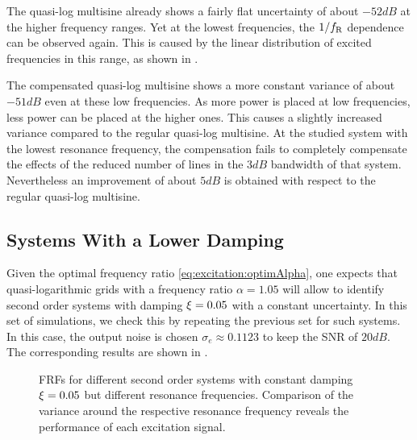   The quasi-log multisine already shows a fairly flat uncertainty of about $-52 \unit{dB}$ at the higher frequency ranges.
  Yet at the lowest frequencies, the $1/f_{\mathrm{R}}$ dependence can be observed again.
  This is caused by the linear distribution of excited frequencies in this range, as shown in .

  The compensated quasi-log multisine shows a more constant variance of about $-51 \unit{dB}$ even at these low frequencies.
  As more power is placed at low frequencies, less power can be placed at the higher ones.
  This causes a slightly increased variance compared to the regular quasi-log multisine.
  At the studied system with the lowest resonance frequency, the compensation fails to completely compensate the effects of the reduced number of lines in the $3\unit{dB}$ bandwidth of that system.
  Nevertheless an improvement of about $5\unit{dB}$ is obtained with respect to the regular quasi-log multisine.

  \subsection{Systems With a Lower Damping}
  Given the optimal frequency ratio \eqref{eq:excitation:optimAlpha}, one expects that quasi-logarithmic grids with a frequency ratio $\alpha = 1.05$ will allow to identify second order systems with damping $\xi_{} = 0.05$ with a constant uncertainty.
  In this set of simulations, we check this by repeating the previous set for such systems.
  In this case, the output noise is chosen $\sigma_e \approx 0.1123$ to keep the \gls{SNR} of $20\unit{dB}$.
  The corresponding results are shown in .
 
  \begin{figure}%
    \centering
      \setlength{}
      \setlength\figureheight{0.68\figurewidth}
    
    \caption[Simulated  of systems (damping $\xi=0.05$) for different excitations.]{\Glspl{FRF} for different second order systems with constant damping $\xi_{}=0.05$ but different resonance frequencies. 
    Comparison of the variance around the respective resonance frequency reveals the performance of each excitation signal.}%
    \label{fig:excitation:damping005}
  \end{figure}

